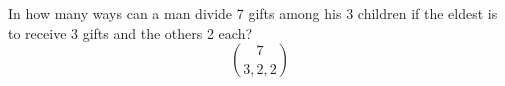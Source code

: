 \item  In how many ways can a man divide 7 gifts among his 3 children if the eldest is to receive 3 gifts and the others 2 each?
\[ \binom{7}{3,2,2} \]